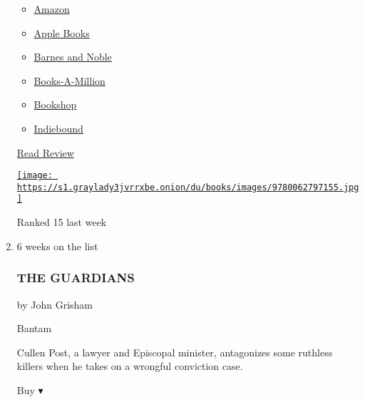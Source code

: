 \begin{enumerate}
  \begin{itemize}
  \tightlist
  \item
    \href{https://www.amazon.com/Tattooist-Auschwitz-Novel-Heather-Morris/dp/0062797158?tag=NYTBS-20}{Amazon}
  \item
    \href{https://du-gae-books-dot-nyt-du-prd.appspot.com/buy?title=THE+TATTOOIST+OF+AUSCHWITZ\&author=Heather+Morris}{Apple
    Books}
  \item
    \href{https://www.anrdoezrs.net/click-7990613-11819508?url=https\%3A\%2F\%2Fwww.barnesandnoble.com\%2Fw\%2F\%3Fean\%3D9780062797155}{Barnes
    and Noble}
  \item
    \href{https://www.anrdoezrs.net/click-7990613-35140?url=https\%3A\%2F\%2Fwww.booksamillion.com\%2Fp\%2FTHE\%2BTATTOOIST\%2BOF\%2BAUSCHWITZ\%2FHeather\%2BMorris\%2F9780062797155}{Books-A-Million}
  \item
    \href{https://bookshop.org/a/3546/9780062797155}{Bookshop}
  \item
    \href{https://www.indiebound.org/book/9780062797155?aff=NYT}{Indiebound}
  \end{itemize}

  \href{https://www.nytimes3xbfgragh.onion/2018/11/16/books/review/tattooist-auschwitz-heather-morris.html}{Read
  Review}

  \href{https://www.nytimes3xbfgragh.onion/2018/11/16/books/review/tattooist-auschwitz-heather-morris.html}{\texttt{[image: https://s1.graylady3jvrrxbe.onion/du/books/images/9780062797155.jpg]}}

  Ranked 15 last week
\item
  6 weeks on the list

  \hypertarget{the-guardians}{%
  \subsubsection{THE GUARDIANS}\label{the-guardians}}

  by John Grisham

  Bantam

  Cullen Post, a lawyer and Episcopal minister, antagonizes some
  ruthless killers when he takes on a wrongful conviction case.

  Buy ▾


\end{enumerate}
